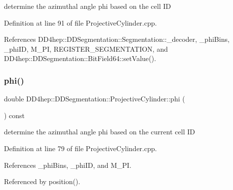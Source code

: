 determine the azimuthal angle phi based on the cell ID 



Definition at line 91 of file Projective\+Cylinder.\+cpp.



References D\+D4hep\+::\+D\+D\+Segmentation\+::\+Segmentation\+::\+\_\+decoder, \+\_\+phi\+Bins, \+\_\+phi\+ID, M\+\_\+\+PI, R\+E\+G\+I\+S\+T\+E\+R\+\_\+\+S\+E\+G\+M\+E\+N\+T\+A\+T\+I\+ON, and D\+D4hep\+::\+D\+D\+Segmentation\+::\+Bit\+Field64\+::set\+Value().

\hypertarget{class_d_d4hep_1_1_d_d_segmentation_1_1_projective_cylinder_a9da59e50c00faa415c44fca9f97faee5}{}\label{class_d_d4hep_1_1_d_d_segmentation_1_1_projective_cylinder_a9da59e50c00faa415c44fca9f97faee5} 
\subsubsection{\texorpdfstring{phi()}{phi()}\hspace{0.1cm}{\footnotesize\ttfamily [2/2]}}
{\footnotesize\ttfamily double D\+D4hep\+::\+D\+D\+Segmentation\+::\+Projective\+Cylinder\+::phi (\begin{DoxyParamCaption}{ }\end{DoxyParamCaption}) const\hspace{0.3cm}{\ttfamily [protected]}}



determine the azimuthal angle phi based on the current cell ID 



Definition at line 79 of file Projective\+Cylinder.\+cpp.



References \+\_\+phi\+Bins, \+\_\+phi\+ID, and M\+\_\+\+PI.



Referenced by position().

\hypertarget{class_d_d4hep_1_1_d_d_segmentation_1_1_projective_cylinder_a3ebe56442e3120fd1cd5a7ef3a8ad1ee}{}\label{class_d_d4hep_1_1_d_d_segmentation_1_1_projective_cylinder_a3ebe56442e3120fd1cd5a7ef3a8ad1ee} 
